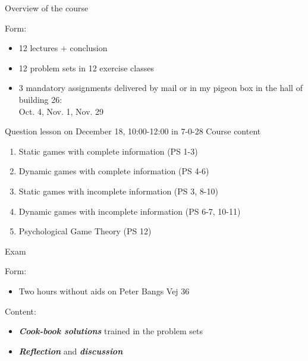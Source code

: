 \begin{frame}{Overview of the course}
\begin{multicols}{2}
\color{lightgray}
Form:
\begin{itemize}\color{lightgray}
  \item[\textcolor{lightgray}{\textbullet}] 12 lectures + conclusion
  \item[\textcolor{lightgray}{\textbullet}] 12 problem sets in 12 exercise classes
  \item[\textcolor{lightgray}{\textbullet}] 3 mandatory assignments delivered by mail or in my pigeon box in the hall of building 26: \\
  Oct. 4, Nov. 1, Nov. 29
\end{itemize}
Question lesson on December 18, 10:00-12:00 in 7-0-28
\vfill\null
\columnbreak
\color{black}
Course content
\begin{enumerate}
  \item Static games with complete information (PS 1-3)
  \item Dynamic games with complete information (PS 4-6)
  \item Static games with incomplete information (PS 3, 8-10)
  \item Dynamic games with incomplete information (PS 6-7, 10-11)
  \item Psychological Game Theory (PS 12)
\end{enumerate}
\vfill\null
\end{multicols}
\end{frame}

\begin{frame}{Exam}
\begin{multicols}{2}
Form:
\begin{itemize}
  \item Two hours without aids on Peter Bangs Vej 36
\end{itemize}
Content:
\begin{itemize}
  \item \textit{\textbf{Cook-book solutions}} trained in the problem sets
  \item \textit{\textbf{Reflection}} and \textit{\textbf{discussion}}
\end{itemize}
\columnbreak
\vfill\null
\end{multicols}
\end{frame}

